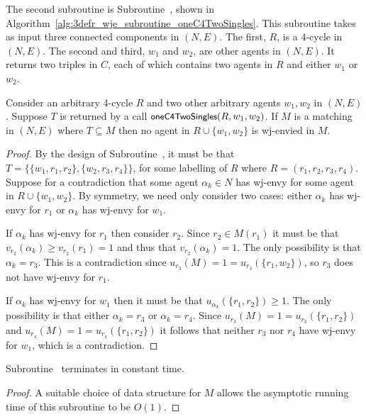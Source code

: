 The second subroutine is Subroutine~, shown in Algorithm~\ref{alg:3defr_wje_subroutine_oneC4TwoSingles}. This subroutine takes as input three connected components in $(N, E)$. The first, $R$, is a $4$-cycle in $(N, E)$. The second and third, $w_1$ and $w_2$, are other agents in $(N, E)$. It returns two triples in $C$, each of which contains two agents in $R$ and either $w_1$ or $w_2$.



\begin{lem}
\label{lem:threed_efr_as_max_degree_2_subgraph_oneC4TwoSingles}
Consider an arbitrary $4$-cycle $R$ and two other arbitrary agents $w_1, w_2$ in $(N, E)$. Suppose $T$ is returned by a call $\algorithmfont{oneC4TwoSingles}(R, w_1, w_2)$. If $M$ is a matching in $(N, E)$ where $T \subseteq M$ then no agent in $R \cup \{ w_1, w_2 \}$ is wj-envied in $M$.
\end{lem}
\begin{proof}
By the design of Subroutine~, it must be that $T = \{ \{ w_1, r_1, r_2  \}, \{ w_2, r_3, r_4 \} \}$, for some labelling of $R$ where $R= ( r_1, r_2, r_3, r_4 )$. Suppose for a contradiction that some agent $\alpha_k \in N$ has wj-envy for some agent in $R \cup \{ w_1, w_2 \}$. By symmetry, we need only consider two cases: either $\alpha_k$ has wj-envy for $r_1$ or $\alpha_k$ has wj-envy for $w_1$. 

If $\alpha_k$ has wj-envy for $r_1$ then consider $r_2$. Since $r_2 \in M(r_1)$ it must be that $v_{r_2}(\alpha_k) \geq v_{r_2}(r_1) = 1$ and thus that $v_{r_2}(\alpha_k)=1$. The only possibility is that $\alpha_k = r_3$. This is a contradiction since $u_{r_3}(M) = 1 = u_{r_3}(\{ r_1, w_2 \})$, so $r_3$ does not have wj-envy for $r_1$. 

If $\alpha_k$ has wj-envy for $w_1$ then it must be that $u_{\alpha_k}(\{ r_1, r_2 \}) \geq 1$. The only possibility is that either $\alpha_k = r_3$ or $\alpha_k = r_4$. Since $u_{r_3}(M) = 1 = u_{r_3}(\{ r_1, r_2 \})$ and $u_{r_4}(M) = 1 = u_{r_4}(\{ r_1, r_2 \})$ it follows that neither $r_3$ nor $r_4$ have wj-envy for $w_1$, which is a contradiction.
\end{proof}

\begin{lem}
\label{lem:threed_efr_as_wjenvy_max_degree_2_subroutine_oneC4TwoSingles_running_times}
Subroutine~ terminates in constant time.
\end{lem}
\begin{proof}
A suitable choice of data structure for $M$ allows the asymptotic running time of this subroutine to be $O(1)$.
\end{proof}

